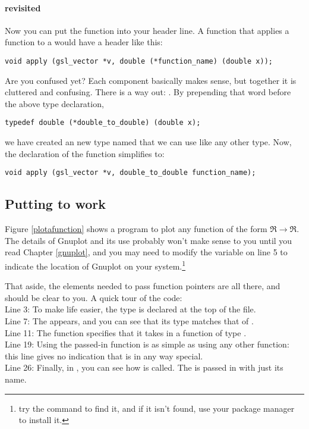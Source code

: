 \paragraph{ revisited}
Now you can put the function into your header line. A function that
applies a function to a  would have a header like
this:
\begin{lstlisting}
void apply (gsl_vector *v, double (*function_name) (double x));
\end{lstlisting}

Are you confused yet? Each component basically makes sense, but together
it is cluttered and confusing. There is a way out: . By prepending
that word before the above type declaration,
\begin{lstlisting}
typedef double (*double_to_double) (double x);
\end{lstlisting}
we have created an new type named  that we can
use like any other type. Now, the declaration of the  function
simplifies to:
\begin{lstlisting}[emph={double_to_double,gsl_vector}]
void apply (gsl_vector *v, double_to_double function_name);
\end{lstlisting}

\subsection{Putting  to work}
Figure \ref{plotafunction} shows a program to plot any function of the
form $\Re\to\Re$. The
details of Gnuplot and its use probably won't make sense to you until
you read Chapter \ref{gnuplot}, and you may need to modify the
 variable on line 5 to indicate the location of Gnuplot on
your system.\footnote{try the command  to find it,
and if it isn't found, use your package manager to install it.}

That aside, the elements needed to pass function pointers are all there,
and should be clear to you. A quick tour of the code:\\
Line 3: To make life easier, the  type is
declared at the top of the file. \\
Line 7: The  appears, and you can see that its type matches that of . \\
Line 11: The  function specifies that it takes in a function of type
.\\
Line 19: Using the passed-in function is as simple
as using any other function: this line  gives no
indication that  is in any way special.  \\
Line 26: Finally, in ,
you can see how  is called. The 
is passed in with just its name.

